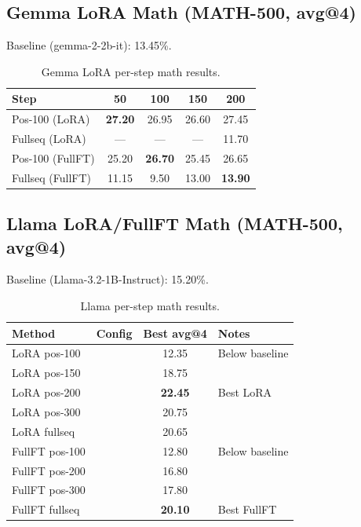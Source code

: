 \documentclass[10pt]{article}
\begin{document}
\subsection{Gemma LoRA Math (MATH-500, avg@4)}

Baseline (gemma-2-2b-it): 13.45\%.

\begin{table}[h]
\centering
\caption{Gemma LoRA per-step math results.}
\small
\begin{tabular}{@{}lcccc@{}}
\toprule
\textbf{Step} & 50 & 100 & 150 & 200 \\
\midrule
Pos-100 (LoRA) & \textbf{27.20} & 26.95 & 26.60 & 27.45 \\
Fullseq (LoRA) & --- & --- & --- & 11.70 \\
\midrule
Pos-100 (FullFT) & 25.20 & \textbf{26.70} & 25.45 & 26.65 \\
Fullseq (FullFT) & 11.15 & 9.50 & 13.00 & \textbf{13.90} \\
\bottomrule
\end{tabular}
\end{table}

\subsection{Llama LoRA/FullFT Math (MATH-500, avg@4)}

Baseline (Llama-3.2-1B-Instruct): 15.20\%.

\begin{table}[h]
\centering
\caption{Llama per-step math results.}
\small
\begin{tabular}{@{}lccl@{}}
\toprule
\textbf{Method} & \textbf{Config} & \textbf{Best avg@4} & \textbf{Notes} \\
\midrule
LoRA pos-100  & & 12.35 & Below baseline \\
LoRA pos-150  & & 18.75 & \\
LoRA pos-200  & & \textbf{22.45} & Best LoRA \\
LoRA pos-300  & & 20.75 & \\
LoRA fullseq  & & 20.65 & \\
\midrule
FullFT pos-100 & & 12.80 & Below baseline \\
FullFT pos-200 & & 16.80 & \\
FullFT pos-300 & & 17.80 & \\
FullFT fullseq & & \textbf{20.10} & Best FullFT \\
\bottomrule
\end{tabular}
\end{table}
\end{document}
